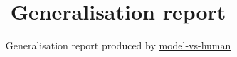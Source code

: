 \documentclass[]{article}
\title{Generalisation report}
\author{%
	Generalisation report produced by \href{https://github.com/bethgelab/model-vs-human}{model-vs-human}\\
}
\begin{document}
\newcommand{\figwidth}{0.24\textwidth}
\newcommand{\captionspace}{-1.5\baselineskip}
\newcommand{\captionspaceII}{0.6\baselineskip}
\newcommand{\captionspaceBenchmark}{-0.5\baselineskip}


\maketitle










\end{document}
